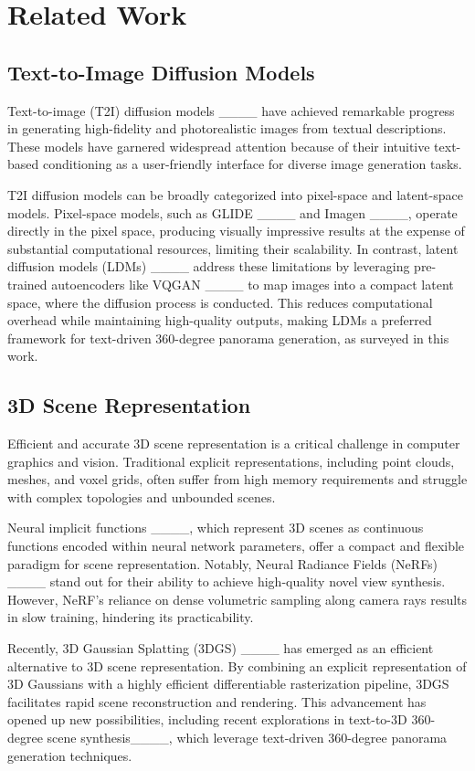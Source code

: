 \section{Related Work}
\subsection{Text-to-Image Diffusion Models}

Text-to-image (T2I) diffusion models ____ have achieved remarkable progress in generating high-fidelity and photorealistic images from textual descriptions. These models have garnered widespread attention because of their intuitive text-based conditioning as a user-friendly interface for diverse image generation tasks.

T2I diffusion models can be broadly categorized into pixel-space and latent-space models. Pixel-space models, such as GLIDE ____ and Imagen ____, operate directly in the pixel space, producing visually impressive results at the expense of substantial computational resources, limiting their scalability. In contrast, latent diffusion models (LDMs) ____ address these limitations by leveraging pre-trained autoencoders like VQGAN ____ to map images into a compact latent space, where the diffusion process is conducted. This reduces computational overhead while maintaining high-quality outputs, making LDMs a preferred framework for text-driven 360-degree panorama generation, as surveyed in this work.

\subsection{3D Scene Representation}

Efficient and accurate 3D scene representation is a critical challenge in computer graphics and vision. Traditional explicit representations, including point clouds, meshes, and voxel grids, often suffer from high memory requirements and struggle with complex topologies and unbounded scenes.

Neural implicit functions ____, which represent 3D scenes as continuous functions encoded within neural network parameters, offer a compact and flexible paradigm for scene representation. Notably, Neural Radiance Fields (NeRFs) ____ stand out for their ability to achieve high-quality novel view synthesis. However, NeRF's reliance on dense volumetric sampling along camera rays results in slow training, hindering its practicability.

Recently, 3D Gaussian Splatting (3DGS) ____ has emerged as an efficient alternative to 3D scene representation. By combining an explicit representation of 3D Gaussians with a highly efficient differentiable rasterization pipeline, 3DGS facilitates rapid scene reconstruction and rendering. This advancement has opened up new possibilities, including recent explorations in text-to-3D 360-degree scene synthesis____, which leverage text-driven 360-degree panorama generation techniques.